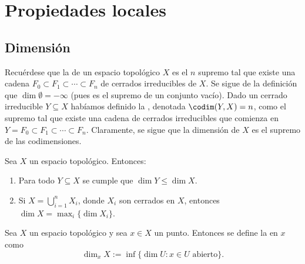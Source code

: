 \chapter{Propiedades locales}

\section{Dimensión}
Recuérdese que la  de un espacio topológico $X$ es el $n$ supremo tal que existe una cadena $F_0 \subset F_1 \subset \cdots
\subset F_n$ de cerrados irreducibles de $X$.
Se sigue de la definición que $\dim\emptyset = -\infty$ (pues es el supremo de un conjunto vacío).
Dado un cerrado irreducible $Y \subseteq X$ habíamos definido la , denotada $\codim(Y, X) = n$, como el supremo
tal que existe una cadena de cerrados irreducibles que comienza en $Y = F_0 \subset F_1 \subset \cdots \subset F_n$.
Claramente, se sigue que la dimensión de $X$ es el supremo de las codimensiones.

\begin{prop}
	Sea $X$ un espacio topológico. Entonces:
	\begin{enumerate}
		\item Para todo $Y \subseteq X$ se cumple que $\dim Y \le \dim X$.
		\item Si $X = \bigcup_{i=1}^n X_i$, donde $X_i$ son cerrados en $X$, entonces $\dim X = \max_i \{ \dim X_i \}$.
	\end{enumerate}
\end{prop}

\begin{mydef}
	Sea $X$ un espacio topológico y sea $x \in X$ un punto.
	Entonces se define la  en $x$ como
	$$ \dim_x X := \inf\{ \dim U : x \in U \text{ abierto} \}. $$
\end{mydef}

